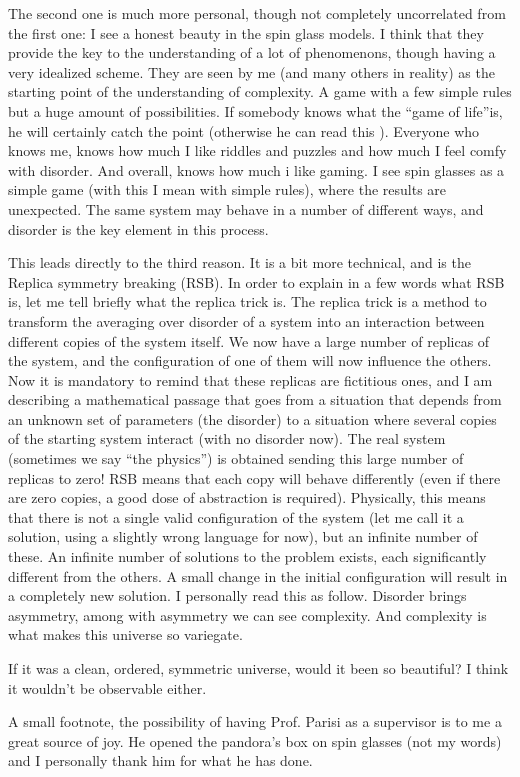 The second one is much more personal, though not completely uncorrelated from the first one: I see a honest beauty in the spin glass models. I think that they provide the key to the understanding of a lot of phenomenons, though having a very idealized scheme. They are seen by me (and many others in reality) as the starting point of the understanding of complexity. A game with a few simple rules but a huge amount of possibilities. If somebody knows what the \textquotedblleft game of life\textquotedblright is, he will certainly catch the point (otherwise he can read this \cite{life}).
Everyone who knows me, knows how much I like riddles and puzzles and how much I feel comfy with disorder. And overall, knows how much i like gaming.
I see spin glasses as a simple game (with this I mean with simple rules), where the results are unexpected. The same system may behave in a number of different ways, and disorder is the key element in this process.

This leads directly to the third reason. It is a bit more technical, and is the Replica symmetry breaking (RSB). In order to  explain in a few words what RSB is, let me tell briefly what the replica trick is.
The replica trick is a method to transform the averaging over disorder of a system into an interaction between different copies of the system itself. We now have a large number of replicas of the system, and the configuration of one of them will now influence the others. Now it is mandatory to remind that these replicas are fictitious ones, and I am describing a mathematical passage that goes from a situation that depends from an unknown set of parameters (the disorder) to a situation where several copies of the starting system interact (with no disorder now). The real system (sometimes we say \textquotedblleft the physics\textquotedblright) is obtained sending this large number of replicas to zero! RSB means that each copy will behave differently (even if there are zero copies, a good dose of abstraction is required). Physically, this means that there is not a single valid configuration of the system (let me call it a solution, using a slightly wrong language for now), but an infinite number of these. An infinite number of solutions to the problem exists, each significantly different from the others. A small change in the initial configuration will result in a completely new solution. I personally read this as follow. Disorder brings asymmetry, among with asymmetry we can see complexity. And complexity is what makes this universe so variegate.

If it was a clean, ordered, symmetric universe, would it been so beautiful? I think it wouldn't be observable either.

\vspace

A small footnote, the possibility of having Prof. Parisi as a supervisor is to me a great source of joy. He opened the pandora's box on spin glasses (not my words) and I personally thank him for what he has done.















